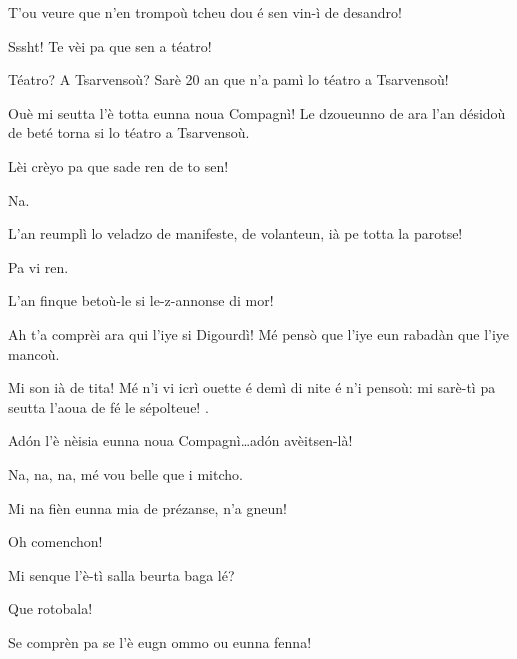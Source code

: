 \begin{drama}
\TsachaouIIspeaks T’ou veure que n'en trompoù tcheu dou é sen vin-ì de desandro!

\Mammaspeaks{} Sssht! Te vèi pa que sen a téatro!

\TsachaouIIspeaks Téatro? A Tsarvensoù? Sarè 20 an que n'a pamì lo téatro a Tsarvensoù!

\Mammaspeaks Ouè mi seutta l'è totta eunna noua Compagnì! Le dzou\-eun\-no de ara l'an désidoù de beté torna si lo téatro a Tsarvensoù.


\Mammaspeaks Lèi crèyo pa que sade ren de to sen!

\TsachaouIspeaks Na.

\Mammaspeaks L'an reumplì lo veladzo de manifeste, de volanteun, ià pe totta la parotse!

\TsachaouIspeaks Pa vi ren.

\Mammaspeaks L'an finque betoù-le si le-z-annonse di mor!

\TsachaouIspeaks{} Ah t'a comprèi ara qui l'iye si Digourdì! Mé pensò que l'iye eun rabadàn que l'iye mancoù.

\TsachaouIIspeaks Mi son ià de tita! Mé n'i vi icrì ouette é demì di nite é n'i pensoù: \og mi sarè-tì pa seutta l'aoua de fé le sépolteue! \fg .

\TsachaouIspeaks Ad\'on l'è nèisia eunna noua Compagnì\ldots ad\'on a\-vèi\-tsen-là!

\Vetchotspeaks Na, na, na, mé vou belle que i mitcho.

\TsachaouIspeaks{} Mi na fièn eunna mia de prézanse, n'a gneun!


\Mammaspeaks Oh comenchon!



\Vetchotspeaks{} Mi senque l'è-tì salla beurta baga lé?


\Spectateurspeaks Que rotobala!

\Vetchotspeaks Se comprèn pa se l'è eugn ommo ou eunna fenna!


\end{drama}
